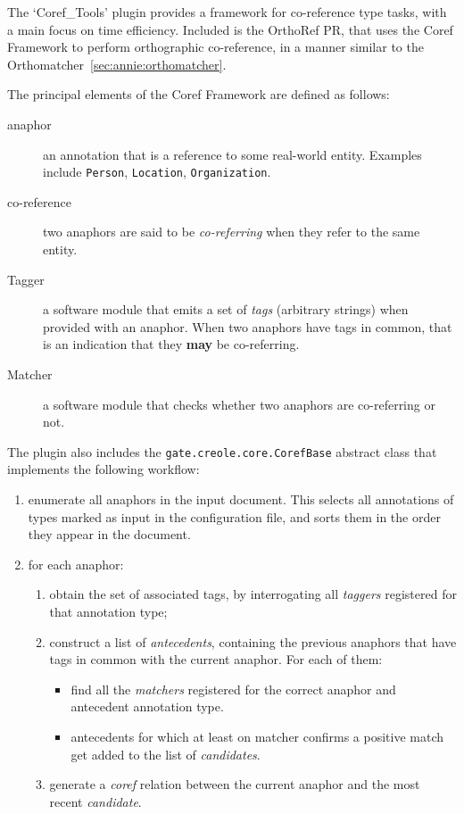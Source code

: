 The `Coref\_Tools' plugin provides a framework for co-reference type tasks, with
a main focus on time efficiency. Included is the OrthoRef PR, that uses the
Coref Framework to perform orthographic co-reference, in a manner similar to the
Orthomatcher~\ref{sec:annie:orthomatcher}.

The principal elements of the Coref Framework are defined as follows:
\begin{description}
\item[anaphor] an annotation that is a reference to some real-world entity.
  Examples include {\tt Person}, {\tt Location}, {\tt Organization}.
\item[co-reference] two anaphors are said to be {\em co-referring} when they
  refer to the same entity. 
\item[Tagger] a software module that emits a set of {\em tags}
  (arbitrary strings) when provided with an anaphor. When two anaphors have tags
  in common, that is an indication that they {\bf may} be co-referring.
\item[Matcher] a software module that checks whether two anaphors are
  co-referring or not.
\end{description}

The plugin also includes the \lstinline!gate.creole.core.CorefBase! abstract
class that implements the following workflow:
\begin{enumerate}
  \item enumerate all anaphors in the input document. This selects all
  annotations of types marked as input in the configuration file, and sorts them
  in the order they appear in the document.
  \item for each anaphor:
  \begin{enumerate}
    \item obtain the set of associated tags, by interrogating all {\em taggers}
    registered for that annotation type;
    \item construct a list of {\em antecedents}, containing the previous
    anaphors that have tags in common with the current anaphor. For each of
    them:
    \begin{itemize}
      \item find all the {\em matchers} registered for the correct anaphor and
      antecedent annotation type.
      \item antecedents for which at least on matcher confirms a positive match
      get added to the list of {\em candidates}.
    \end{itemize}
    \item generate a {\em coref} relation between the current anaphor and the
    most recent {\em candidate}.
  \end{enumerate} 
\end{enumerate}

